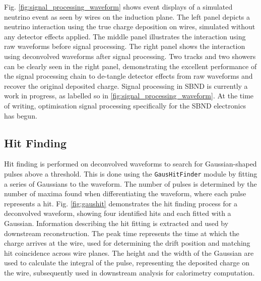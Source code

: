 Fig. \ref{fig:signal_processing_waveform} shows event displays of a simulated neutrino event as seen by wires on the induction plane.
The left panel depicts a neutrino interaction using the true charge deposition on wires, simulated without any detector effects applied.
The middle panel illustrates the interaction using raw waveforms before signal processing.
The right panel shows the interaction using deconvolved waveforms after signal processing.
Two tracks and two showers can be clearly seen in the right panel, demonstrating the excellent performance of the signal processing chain to de-tangle detector effects from raw waveforms and recover the original deposited charge.
Signal processing in SBND is currently a work in progress, as labelled so in \ref{fig:signal_processing_waveform}.
At the time of writing, optimisation signal processing specifically for the SBND electronics has begun.


\subsection{Hit Finding}
\label{sec:hit_find}

Hit finding is performed on deconvolved waveforms to search for Gaussian-shaped pulses above a threshold.
This is done using the \texttt{GausHitFinder} module \cite{gaushitfinder} by fitting a series of Gaussians to the waveform.         
The number of pulses is determined by the number of maxima found when differentiating the waveform, where each pulse represents a hit. 
Fig. \ref{fig:gaushit} demonstrates the hit finding process for a deconvolved waveform, showing four identified hits and each fitted with a Gaussian.
Information describing the hit fitting is extracted and used by downstream reconstruction.
The peak time represents the time at which the charge arrives at the wire, used for determining the drift position and matching hit coincidence across wire planes.
The height and the width of the Gaussian are used to calculate the integral of the pulse, representing the deposited charge on the wire, subsequently used in downstream analysis for calorimetry computation.

